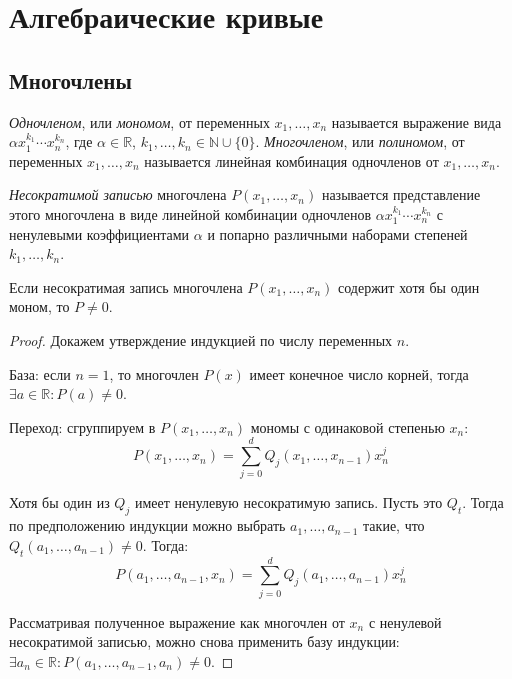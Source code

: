 \section{Алгебраические кривые}

\subsection{Многочлены}

\begin{definition}
	\textit{Одночленом}, или \textit{мономом}, от переменных $x_1, \dotsc, x_n$ называется выражение вида $\alpha x_1^{k_1} \dotsm x_n^{k_n}$, где $\alpha \in \mathbb{R}$, $k_1, \dotsc, k_n \in \mathbb{N} \cup \{0\}$. \textit{Многочленом}, или \textit{полиномом}, от переменных $x_1, \dotsc, x_n$ называется линейная комбинация одночленов от $x_1, \dotsc, x_n$.
\end{definition}

\begin{definition}
	\textit{Несократимой записью} многочлена $P(x_1, \dotsc, x_n)$ называется представление этого многочлена в виде линейной комбинации одночленов $\alpha x_1^{k_1} \dotsm x_n^{k_n}$ с ненулевыми коэффициентами $\alpha$ и попарно различными наборами степеней $k_1, \dotsc, k_n$.
\end{definition}

\begin{proposition}
	Если несократимая запись многочлена $P(x_1, \dots, x_n)$ содержит хотя бы один моном, то $P \ne 0$.
\end{proposition}

\begin{proof}
	Докажем утверждение индукцией по числу переменных $n$.
	
	База: если $n = 1$, то многочлен $P(x)$ имеет конечное число корней, тогда $\exists a \in \mathbb{R}: P(a) \ne 0$.
	
	Переход: сгруппируем в $P(x_1, \dots, x_n)$ мономы с одинаковой степенью $x_n$:
	\[P(x_1, \dots, x_n) = \sum_{j = 0}^dQ_j(x_1,\dots, x_{n-1})x_n^j\]
	
	Хотя бы один из $Q_j$ имеет ненулевую несократимую запись. Пусть это $Q_t$. Тогда по предположению индукции можно выбрать $a_1,\dots,a_{n-1}$ такие, что $Q_t(a_1, \dots, a_{n-1}) \ne 0$. Тогда:
	\[P(a_1, \dots, a_{n-1}, x_n) = \sum_{j = 0}^dQ_j(a_1,\dots,a_{n-1})x_n^j\]
	
	Рассматривая полученное выражение как многочлен от $x_n$ с ненулевой несократимой записью, можно снова применить базу индукции: $\exists a_n \in \mathbb{R}:P(a_1, \dots, a_{n-1}, a_n) \ne 0$.
\end{proof}

